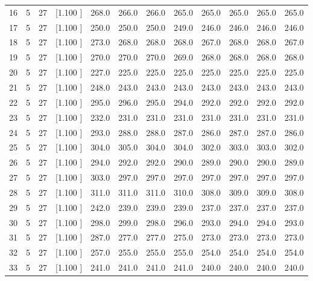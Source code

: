 \documentclass[12pt,a4paper]{article}
\begin{document}
\begin{center}
{\begin{tabular}{r r r r r r r r r r r r}
  16&  5& 27&[1.100     ]&   268.0&   266.0&   266.0&   265.0&   265.0&   265.0&   265.0&   265.0\\[-0.02in]
  17&  5& 27&[1.100     ]&   250.0&   250.0&   250.0&   249.0&   246.0&   246.0&   246.0&   246.0\\[-0.02in]
  18&  5& 27&[1.100     ]&   273.0&   268.0&   268.0&   268.0&   267.0&   268.0&   268.0&   267.0\\[-0.02in]
  19&  5& 27&[1.100     ]&   270.0&   270.0&   270.0&   269.0&   268.0&   268.0&   268.0&   268.0\\[-0.02in]
  20&  5& 27&[1.100     ]&   227.0&   225.0&   225.0&   225.0&   225.0&   225.0&   225.0&   225.0\\[-0.02in]
  21&  5& 27&[1.100     ]&   248.0&   243.0&   243.0&   243.0&   243.0&   243.0&   243.0&   243.0\\[-0.02in]
  22&  5& 27&[1.100     ]&   295.0&   296.0&   295.0&   294.0&   292.0&   292.0&   292.0&   292.0\\[-0.02in]
  23&  5& 27&[1.100     ]&   232.0&   231.0&   231.0&   231.0&   231.0&   231.0&   231.0&   231.0\\[-0.02in]
  24&  5& 27&[1.100     ]&   293.0&   288.0&   288.0&   287.0&   286.0&   287.0&   287.0&   286.0\\[-0.02in]
  25&  5& 27&[1.100     ]&   304.0&   305.0&   304.0&   304.0&   302.0&   303.0&   303.0&   302.0\\[-0.02in]
  26&  5& 27&[1.100     ]&   294.0&   292.0&   292.0&   290.0&   289.0&   290.0&   290.0&   289.0\\[-0.02in]
  27&  5& 27&[1.100     ]&   303.0&   297.0&   297.0&   297.0&   297.0&   297.0&   297.0&   297.0\\[-0.02in]
  28&  5& 27&[1.100     ]&   311.0&   311.0&   311.0&   310.0&   308.0&   309.0&   309.0&   308.0\\[-0.02in]
  29&  5& 27&[1.100     ]&   242.0&   239.0&   239.0&   239.0&   237.0&   237.0&   237.0&   237.0\\[-0.02in]
  30&  5& 27&[1.100     ]&   298.0&   299.0&   298.0&   296.0&   293.0&   294.0&   294.0&   293.0\\[-0.02in]
  31&  5& 27&[1.100     ]&   287.0&   277.0&   277.0&   275.0&   273.0&   273.0&   273.0&   273.0\\[-0.02in]
  32&  5& 27&[1.100     ]&   257.0&   255.0&   255.0&   255.0&   254.0&   254.0&   254.0&   254.0\\[-0.02in]
  33&  5& 27&[1.100     ]&   241.0&   241.0&   241.0&   241.0&   240.0&   240.0&   240.0&   240.0\\[-0.02in]

\end{tabular}}
\end{center}
\end{document}
